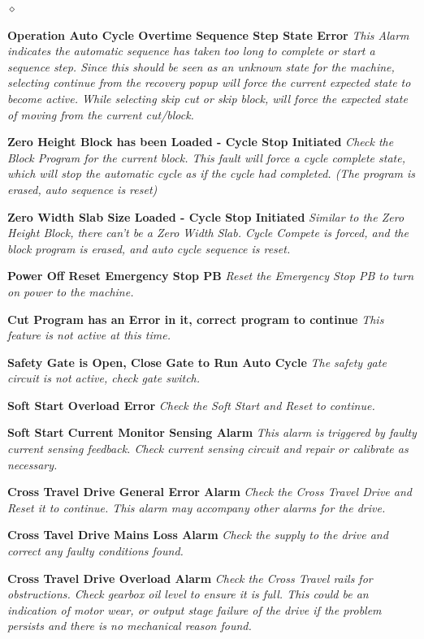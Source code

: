 \begin{list}{$\diamond$}{}
	\item \textbf{Operation Auto Cycle Overtime Sequence Step State Error} \textit{This Alarm indicates the automatic sequence has taken too long to complete or start a sequence step. Since this should be seen as an unknown state for the machine, selecting continue from the recovery popup will force the current expected state to become active. While selecting skip cut or skip block, will force the expected state of moving from the current cut/block.}
	\item \textbf{Zero Height Block has been Loaded - Cycle Stop Initiated} \textit{Check the Block Program for the current block. This fault will force a cycle complete state, which will stop the automatic cycle as if the cycle had completed. (The program is erased, auto sequence is reset)}
	\item \textbf{Zero Width Slab Size Loaded - Cycle Stop Initiated} \textit{Similar to the Zero Height Block, there can't be a Zero Width Slab. Cycle Compete is forced, and the block program is erased, and auto cycle sequence is reset.}
	\item \textbf{Power Off Reset Emergency Stop PB} \textit{Reset the Emergency Stop PB to turn on power to the machine.}
	\item \textbf{Cut Program has an Error in it, correct program to continue} \textit{This feature is not active at this time.}
	\item \textbf{Safety Gate is Open, Close Gate to Run Auto Cycle} \textit{The safety gate circuit is not active, check gate switch.}
	\item \textbf{Soft Start Overload Error} \textit{Check the Soft Start and Reset to continue.}
	\item \textbf{Soft Start Current Monitor Sensing Alarm} \textit{This alarm is triggered by faulty current sensing feedback. Check current sensing circuit and repair or calibrate as necessary.}
	\item \textbf{Cross Travel Drive General Error Alarm} \textit{Check the Cross Travel Drive and Reset it to continue. This alarm may accompany other alarms for the drive.}
	\item \textbf{Cross Tavel Drive Mains Loss Alarm} \textit{Check the supply to the drive and correct any faulty conditions found.}
	\item \textbf{Cross Travel Drive Overload Alarm} \textit{Check the Cross Travel rails for obstructions. Check gearbox oil level to ensure it is full. This could be an indication of motor wear, or output stage failure of the drive if the problem persists and there is no mechanical reason found.}

\end{list}
